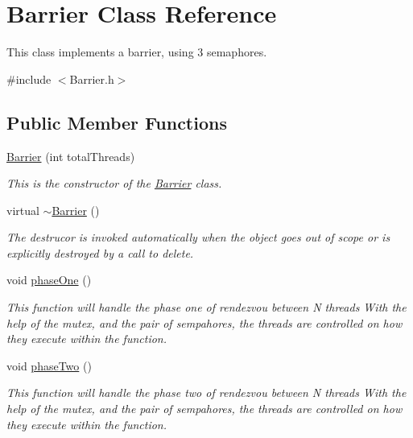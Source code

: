 \hypertarget{class_barrier}{}\section{Barrier Class Reference}
\label{class_barrier}


This class implements a barrier, using 3 semaphores.  




{\ttfamily \#include $<$Barrier.\+h$>$}

\subsection*{Public Member Functions}
\begin{DoxyCompactItemize}
\item 
\hyperlink{class_barrier_a4d825874d4435fb6d7c741fa4d2b540d}{Barrier} (int total\+Threads)
\begin{DoxyCompactList}\small\item\em This is the constructor of the \hyperlink{class_barrier}{Barrier} class. \end{DoxyCompactList}\item 
virtual \hyperlink{class_barrier_a401f40e73302009b305904ffc7825304}{$\sim$\+Barrier} ()
\begin{DoxyCompactList}\small\item\em The destrucor is invoked automatically when the object goes out of scope or is explicitly destroyed by a call to delete. \end{DoxyCompactList}\item 
void \hyperlink{class_barrier_a35c899565ad8db3425aed11daf4f09bd}{phase\+One} ()
\begin{DoxyCompactList}\small\item\em This function will handle the phase one of rendezvou between N threads With the help of the mutex, and the pair of sempahores, the threads are controlled on how they execute within the function. \end{DoxyCompactList}\item 
void \hyperlink{class_barrier_a63271a70390e6680b07d7e701ff6b2e3}{phase\+Two} ()
\begin{DoxyCompactList}\small\item\em This function will handle the phase two of rendezvou between N threads With the help of the mutex, and the pair of sempahores, the threads are controlled on how they execute within the function. \end{DoxyCompactList}\end{DoxyCompactItemize}


